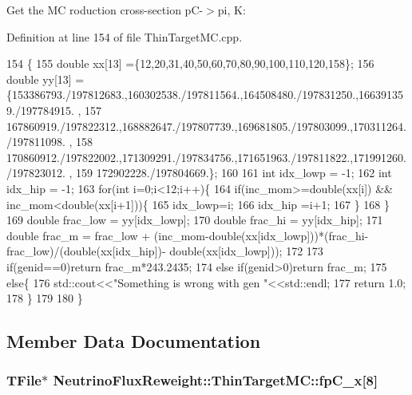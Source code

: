 Get the M\-C roduction cross-\/section p\-C-\/$>$pi, K\-: 



Definition at line 154 of file Thin\-Target\-M\-C.\-cpp.


\begin{DoxyCode}
154                                                             \{
155     \textcolor{keywordtype}{double} xx[13] =\{12,20,31,40,50,60,70,80,90,100,110,120,158\};
156     \textcolor{keywordtype}{double} yy[13] =\{153386793./197812683.,160302538./197811564.,164508480./197831250.,166391359./197784915.
      ,
157                     167860919./197822312.,168882647./197807739.,169681805./197803099.,170311264./197811098.
      ,
158                     170860912./197822002.,171309291./197834756.,171651963./197811822.,171991260./197823012.
      ,
159                   172902228./197804669.\};
160     
161     \textcolor{keywordtype}{int} idx\_lowp = -1;
162     \textcolor{keywordtype}{int} idx\_hip  = -1;
163     \textcolor{keywordflow}{for}(\textcolor{keywordtype}{int} i=0;i<12;i++)\{
164       \textcolor{keywordflow}{if}(inc\_mom>=\textcolor{keywordtype}{double}(xx[i]) && inc\_mom<\textcolor{keywordtype}{double}(xx[i+1]))\{
165         idx\_lowp=i;
166         idx\_hip =i+1;
167       \}
168     \}
169     \textcolor{keywordtype}{double} frac\_low = yy[idx\_lowp];
170     \textcolor{keywordtype}{double} frac\_hi  = yy[idx\_hip];
171     \textcolor{keywordtype}{double} frac\_m   =  frac\_low + (inc\_mom-double(xx[idx\_lowp]))*(frac\_hi-frac\_low)/(double(xx[idx\_hip])-
      double(xx[idx\_lowp]));
172     
173     \textcolor{keywordflow}{if}(genid==0)\textcolor{keywordflow}{return} frac\_m*243.2435;
174     \textcolor{keywordflow}{else} \textcolor{keywordflow}{if}(genid>0)\textcolor{keywordflow}{return} frac\_m;
175     \textcolor{keywordflow}{else}\{
176       std::cout<<\textcolor{stringliteral}{"Something is wrong with gen "}<<std::endl;
177       \textcolor{keywordflow}{return} 1.0;
178     \}
179     
180   \}
\end{DoxyCode}


\subsection{Member Data Documentation}
\hypertarget{class_neutrino_flux_reweight_1_1_thin_target_m_c_ad270ba952a625cc54154e557e2517e05}{
\subsubsection[{fp\-C\-\_\-x}]{\setlength{\rightskip}{0pt plus 5cm}T\-File$\ast$ Neutrino\-Flux\-Reweight\-::\-Thin\-Target\-M\-C\-::fp\-C\-\_\-x\mbox{[}8\mbox{]}\hspace{0.3cm}{\ttfamily [private]}}}\label{class_neutrino_flux_reweight_1_1_thin_target_m_c_ad270ba952a625cc54154e557e2517e05}


